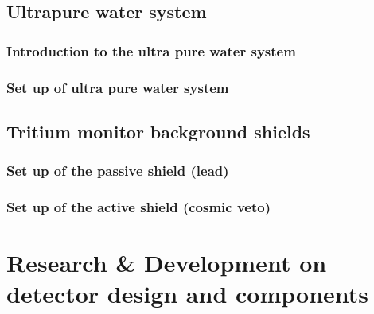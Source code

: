 \documentclass[12pt,a4paper]{book}
\begin{document}
	\section{Ultrapure water system}\label{sec:UltraPureWaterSystem}
		
		\subsection[Introduction water system]{Introduction to the ultra pure water system}
		 \label{subsec:IntroductionWaterSystem}
					
		\subsection[Set up water system]{Set up of ultra pure water system} %
		\label{subsec:SetUpWaterSystem}
		\newpage	
	
	\section[Background shields]{Tritium monitor background shields}\label{sec:BackgroundShields}
	 \label{sec:IntroductionBackground}
	
		\subsection[Set up passive shield]{Set up of the passive shield (lead)} %
		\label{subsec:SetUpPassiveShield}
		
		\subsection[Set up Active veto]{Set up of the active shield (cosmic veto)} %
		\label{subsec:SetUpActiveShield}
		\newpage
					
\chapter[Research \& Development]{Research \& Development on detector design and components}\label{chap:ResearchandDevelopment}
\end{document}
